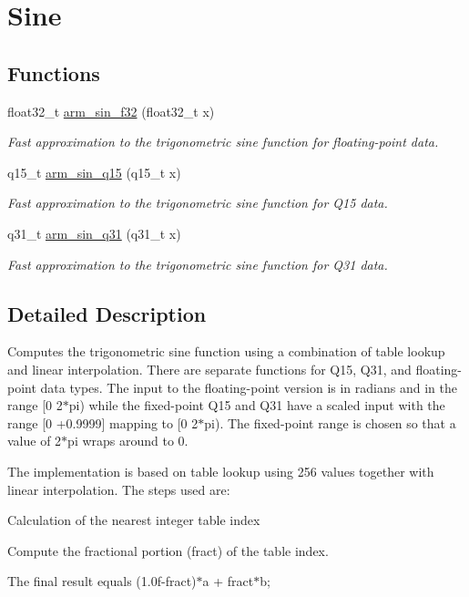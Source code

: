 \hypertarget{group__sin}{}\section{Sine}
\label{group__sin}
\subsection*{Functions}
\begin{DoxyCompactItemize}
\item 
float32\+\_\+t \hyperlink{group__sin_gae164899c4a3fc0e946dc5d55555fe541}{arm\+\_\+sin\+\_\+f32} (float32\+\_\+t x)
\begin{DoxyCompactList}\small\item\em Fast approximation to the trigonometric sine function for floating-\/point data. \end{DoxyCompactList}\item 
q15\+\_\+t \hyperlink{group__sin_ga1fc6d6640be6cfa688a8bea0a48397ee}{arm\+\_\+sin\+\_\+q15} (q15\+\_\+t x)
\begin{DoxyCompactList}\small\item\em Fast approximation to the trigonometric sine function for Q15 data. \end{DoxyCompactList}\item 
q31\+\_\+t \hyperlink{group__sin_ga57aade7d8892585992cdc6375bd82f9c}{arm\+\_\+sin\+\_\+q31} (q31\+\_\+t x)
\begin{DoxyCompactList}\small\item\em Fast approximation to the trigonometric sine function for Q31 data. \end{DoxyCompactList}\end{DoxyCompactItemize}


\subsection{Detailed Description}
Computes the trigonometric sine function using a combination of table lookup and linear interpolation. There are separate functions for Q15, Q31, and floating-\/point data types. The input to the floating-\/point version is in radians and in the range \mbox{[}0 2$\ast$pi) while the fixed-\/point Q15 and Q31 have a scaled input with the range \mbox{[}0 +0.9999\mbox{]} mapping to \mbox{[}0 2$\ast$pi). The fixed-\/point range is chosen so that a value of 2$\ast$pi wraps around to 0.

The implementation is based on table lookup using 256 values together with linear interpolation. The steps used are\+:
\begin{DoxyEnumerate}
\item Calculation of the nearest integer table index
\item Compute the fractional portion (fract) of the table index.
\item The final result equals {\ttfamily (1.\+0f-\/fract)$\ast$a + fract$\ast$b;}
\end{DoxyEnumerate}

